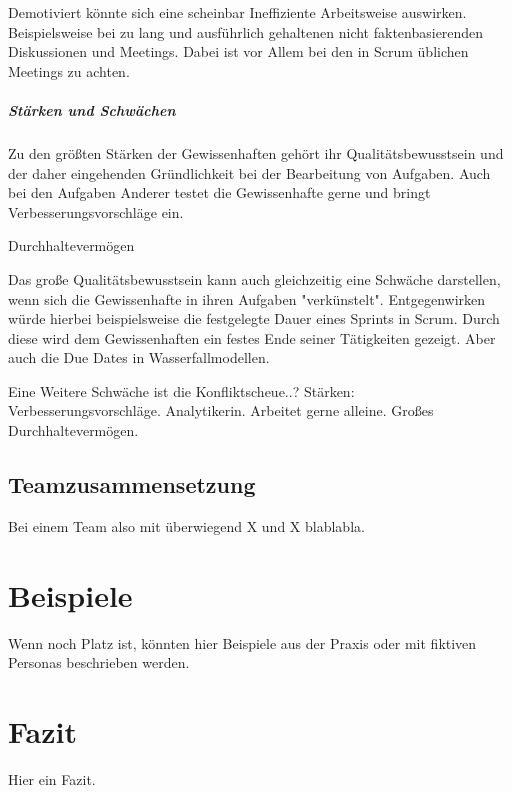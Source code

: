 \documentclass[twocolumn,10pt]{asme2ej}
\begin{document}
Demotiviert könnte sich eine scheinbar Ineffiziente Arbeitsweise auswirken. Beispielsweise bei zu lang und ausführlich gehaltenen nicht faktenbasierenden Diskussionen und Meetings. Dabei ist vor Allem bei den in Scrum üblichen Meetings zu achten.

\subparagraph{Stärken und Schwächen}
Zu den größten Stärken der Gewissenhaften gehört ihr Qualitätsbewusstsein und der daher eingehenden Gründlichkeit bei der Bearbeitung von Aufgaben. Auch bei den Aufgaben Anderer testet die Gewissenhafte gerne und bringt Verbesserungsvorschläge ein. 

Durchhaltevermögen

Das große Qualitätsbewusstsein kann auch gleichzeitig eine Schwäche darstellen, wenn sich die Gewissenhafte in ihren Aufgaben "verkünstelt". Entgegenwirken würde hierbei beispielsweise die festgelegte Dauer eines Sprints in Scrum. Durch diese wird dem Gewissenhaften ein festes Ende seiner Tätigkeiten gezeigt. Aber auch die Due Dates in Wasserfallmodellen.

Eine Weitere Schwäche ist die Konfliktscheue..?
Stärken: Verbesserungsvorschläge. Analytikerin. Arbeitet gerne alleine. Großes Durchhaltevermögen.

\cite{disc_pm}
\subsection{Teamzusammensetzung}
Bei einem Team also mit überwiegend X und X blablabla.

\section{Beispiele}
Wenn noch Platz ist, könnten hier Beispiele aus der Praxis oder mit fiktiven Personas beschrieben werden.

\section{Fazit}
Hier ein Fazit.




\end{document}
